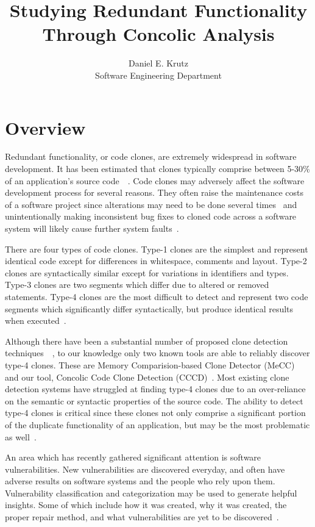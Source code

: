 \documentclass{article}
\title{Studying Redundant Functionality Through Concolic Analysis}
\author{
       Daniel E. Krutz \\
Software Engineering Department
}
\begin{document}
\maketitle


\section{Overview}

Redundant functionality, or code clones, are extremely widespread in software development. It has been estimated that clones typically comprise between 5-30\% of an application's source code~\cite{Baxter:1998:CDU:850947.853341}~\cite{Kim:2005:ESC:1095430.1081737}. Code clones may adversely affect the software development process for several reasons. They often raise the maintenance costs of a software project since alterations may need to be done several times~\cite{Juergens:2009:CCM:1555001.1555062} and unintentionally making inconsistent bug fixes to cloned code across a software system will likely cause further system faults~\cite{Deissenboeck_2010}. 

There are four types of code clones. Type-1 clones are the simplest and represent identical code except for differences in whitespace, comments and layout. Type-2 clones are syntactically similar except for variations in identifiers and types. Type-3 clones are two segments which differ due to altered or removed statements. Type-4 clones are the most difficult to detect and represent two code segments which significantly differ syntactically, but produce identical results when executed~\cite{Gold:2010:ICC:1808901.1808916}. 

Although there have been a substantial number of proposed clone detection techniques~\cite{wcre2013}~\cite{Dan123}, to our knowledge only two known tools are able to reliably discover type-4 clones. These are Memory Comparision-based Clone Detector (MeCC)~\cite{Kim:2011:MMC:1985793.1985835} and our tool, Concolic Code Clone Detection (CCCD)~\cite{wcre2013}. Most existing clone detection systems have struggled at finding type-4 clones due to an over-reliance on the semantic or syntactic properties of the source code. The ability to detect type-4 clones is critical since these clones not only comprise a significant portion of the duplicate functionality of an application, but may be the most problematic as well~\cite{Yuan:2011:CCM:2114489.2114766}. 

An area which has recently gathered significant attention is software vulnerabilities. New vulnerabilities are discovered everyday, and often have adverse results on software systems and the people who rely upon them. Vulnerability classification and categorization may be used to generate helpful insights. Some of which include how it was created, why it was created, the proper repair method, and what vulnerabilities are yet to be discovered~\cite{Wu:2011:ERS:1985793.1985960}.
\end{document}
